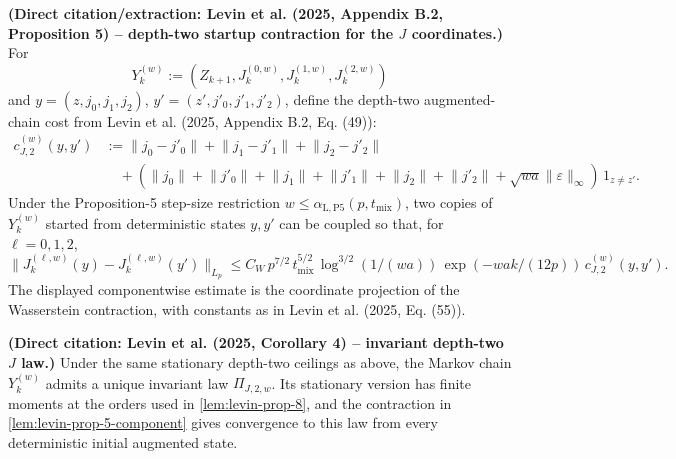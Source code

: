 \begin{lemma}\label{lem:levin-prop-5-component}
  \textbf{(Direct citation/extraction: Levin et al. (2025, Appendix B.2,
  Proposition 5) -- depth-two startup contraction for the $J$ coordinates.)}
  For
  \[
Y_{k}^{(w)} := (Z_{k + 1}, J_{k}^{(0,w)}, J_{k}^{(1,w)}, J_{k}^{(2,w)})
\]
  and $y = (z, j_{0}, j_{1}, j_{2})$,
  $y' = (z', j'_{0}, j'_{1}, j'_{2})$, define the depth-two augmented-chain cost
  from Levin et al. (2025, Appendix B.2, Eq. (49)):
  \begin{equation}
\begin{aligned}
c_{J,2}^{(w)}(y,y')
    &:= \lVert j_{0} - j'_{0} \rVert + \lVert j_{1} - j'_{1} \rVert + \lVert j_{2} - j'_{2} \rVert \\
    &\quad + \left( \lVert j_{0} \rVert + \lVert j'_{0} \rVert + \lVert j_{1} \rVert + \lVert j'_{1} \rVert
          + \lVert j_{2} \rVert + \lVert j'_{2} \rVert + \sqrt{w a} \lVert \varepsilon \rVert_{\infty} \right)
          \, 1_{z \ne z'}.
\end{aligned}
\label{eq:levin-depth-two-cost}
\end{equation}
  Under the Proposition-5 step-size restriction
  $w \le \alpha_{\mathrm{L,P5}}(p,t_{\mathrm{mix}})$, two copies of $Y_{k}^{(w)}$ started from
  deterministic states $y,y'$ can be coupled so that, for
  $\ell = 0,1,2$,
  \begin{equation}
\lVert J_{k}^{(\ell,w)}(y) - J_{k}^{(\ell,w)}(y') \rVert_{L_{p}}
    \le C_{W} \, p^{7 / 2} \, t_{\mathrm{mix}}^{5 / 2}
       \, \log^{3 / 2}(1 / (w a))
       \, \exp\left(-w a k / (12 p)\right)
       \, c_{J,2}^{(w)}(y,y').
\label{eq:levin-depth-two-component-contraction}
\end{equation}
  The displayed componentwise estimate is the coordinate projection of the
  Wasserstein contraction, with constants as in Levin et al. (2025, Eq. (55)).
\end{lemma}

\begin{lemma}\label{lem:levin-invariant-depth-two-law}
  \textbf{(Direct citation: Levin et al. (2025, Corollary 4) -- invariant depth-two
  $J$ law.)}
  Under the same stationary depth-two ceilings as above, the Markov chain
  $Y_{k}^{(w)}$ admits a unique invariant law $\Pi_{J,2,w}$. Its stationary
  version has finite moments at the orders used in
  \cref{lem:levin-prop-8}, and the contraction in
  \cref{lem:levin-prop-5-component} gives convergence to this law from every
  deterministic initial augmented state.
\end{lemma}


